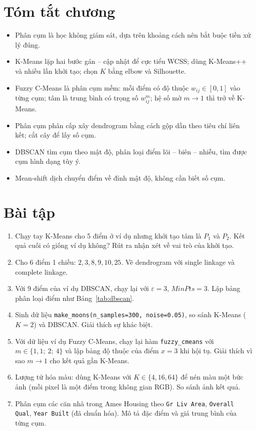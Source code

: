 \section{Tóm tắt chương}
\begin{itemize}
    \item Phân cụm là học không giám sát, dựa trên khoảng cách nên bắt buộc tiền xử lý đúng.
    \item K-Means lặp hai bước gán -- cập nhật để cực tiểu WCSS; dùng K-Means++ và nhiều lần khởi tạo; chọn $K$ bằng elbow và Silhouette.
    \item Fuzzy C-Means là phân cụm mềm: mỗi điểm có độ thuộc $w_{ij} \in [0, 1]$ vào từng cụm; tâm là trung bình có trọng số $w_{ij}^m$; hệ số mờ $m \to 1$ thì trở về K-Means.
    \item Phân cụm phân cấp xây dendrogram bằng cách gộp dần theo tiêu chí liên kết; cắt cây để lấy số cụm.
    \item DBSCAN tìm cụm theo mật độ, phân loại điểm lõi -- biên -- nhiễu, tìm được cụm hình dạng tùy ý.
    \item Mean-shift dịch chuyển điểm về đỉnh mật độ, không cần biết số cụm.
\end{itemize}

\section{Bài tập}
\begin{enumerate}
    \item Chạy tay K-Means cho 5 điểm ở ví dụ nhưng khởi tạo tâm là $P_1$ và $P_2$. Kết quả cuối có giống ví dụ không? Rút ra nhận xét về vai trò của khởi tạo.
    \item Cho 6 điểm 1 chiều: $2, 3, 8, 9, 10, 25$. Vẽ dendrogram với single linkage và complete linkage.
    \item Với 9 điểm của ví dụ DBSCAN, chạy lại với $\varepsilon = 3$, $\mathit{MinPts} = 3$. Lập bảng phân loại điểm như Bảng~\ref{tab:dbscan}.
    \item Sinh dữ liệu \texttt{make\_moons(n\_samples=300, noise=0.05)}, so sánh K-Means ($K = 2$) và DBSCAN. Giải thích sự khác biệt.
    \item Với dữ liệu ví dụ Fuzzy C-Means, chạy lại hàm \texttt{fuzzy\_cmeans} với $m \in \{1{,}1;\ 2;\ 4\}$ và lập bảng độ thuộc của điểm $x = 3$ khi hội tụ. Giải thích vì sao $m \to 1$ cho kết quả gần K-Means.
    \item Lượng tử hóa màu: dùng K-Means với $K \in \{4, 16, 64\}$ để nén màu một bức ảnh (mỗi pixel là một điểm trong không gian RGB). So sánh ảnh kết quả.
    \item Phân cụm các căn nhà trong Ames Housing theo \texttt{Gr Liv Area}, \texttt{Overall Qual}, \texttt{Year Built} (đã chuẩn hóa). Mô tả đặc điểm và giá trung bình của từng cụm.
\end{enumerate}

